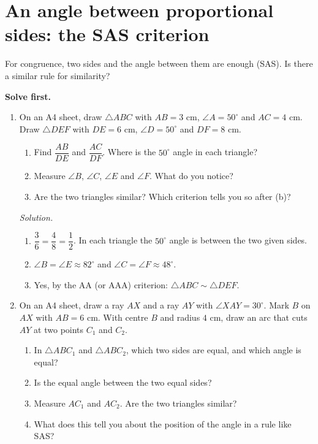 \documentclass[11pt,a4paper]{article}
\theoremstyle{branddef}
\newcommand{\tr}{\triangle}
\newcounter{prob}
\newenvironment{solvefirst}
  {\par\smallskip\noindent\textbf{Solve first.}
   \begin{enumerate}[label=\textbf{P\arabic*.},leftmargin=2.2em,itemsep=3pt,start=\numexpr\value{prob}+1\relax]}
  {\setcounter{prob}{\value{enumi}}\end{enumerate}}
\newenvironment{solution}
  {\par\smallskip\begingroup\small\linespread{1.15}\selectfont\color{muted}\noindent\textit{Solution.}\par}
  {\par\endgroup\smallskip}
\newenvironment{steps}{\begin{enumerate}[label=\arabic*.,leftmargin=1.5em,itemsep=0pt,topsep=2pt]}{\end{enumerate}}
\begin{document}
\section{An angle between proportional sides: the SAS criterion}

For congruence, two sides and the angle between them are enough (SAS). Is there a similar rule for similarity?

\begin{solvefirst}
  \item On an A4 sheet, draw $\tr ABC$ with $AB=3$ cm, $\angle A=50^\circ$ and $AC=4$ cm. Draw $\tr DEF$ with $DE=6$ cm, $\angle D=50^\circ$ and $DF=8$ cm.
  \begin{enumerate}[label=(\alph*),itemsep=1pt]
    \item Find $\dfrac{AB}{DE}$ and $\dfrac{AC}{DF}$. Where is the $50^\circ$ angle in each triangle?
    \item Measure $\angle B$, $\angle C$, $\angle E$ and $\angle F$. What do you notice?
    \item Are the two triangles similar? Which criterion tells you so after (b)?
  \end{enumerate}
\begin{solution}
\begin{steps}
  \item[(a)] $\dfrac36=\dfrac48=\dfrac12$. In each triangle the $50^\circ$ angle is between the two given sides.
  \item[(b)] $\angle B=\angle E\approx82^\circ$ and $\angle C=\angle F\approx48^\circ$.
  \item[(c)] Yes, by the AA (or AAA) criterion: $\tr ABC\sim\tr DEF$.
\end{steps}
\end{solution}
  \item On an A4 sheet, draw a ray $AX$ and a ray $AY$ with $\angle XAY=30^\circ$. Mark $B$ on $AX$ with $AB=6$ cm. With centre $B$ and radius $4$ cm, draw an arc that cuts $AY$ at two points $C_1$ and $C_2$.
  \begin{enumerate}[label=(\alph*),itemsep=1pt]
    \item In $\tr ABC_1$ and $\tr ABC_2$, which two sides are equal, and which angle is equal?
    \item Is the equal angle between the two equal sides?
    \item Measure $AC_1$ and $AC_2$. Are the two triangles similar?
    \item What does this tell you about the position of the angle in a rule like SAS?
  \end{enumerate}


\end{solvefirst}
\end{document}
